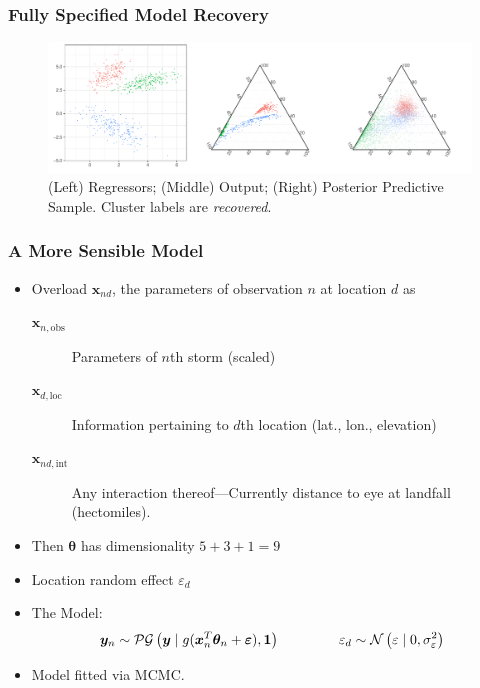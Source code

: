\documentclass[aspectratio=169,10pt,notes]{beamer}
\begin{document}
\begin{frame}
    \frametitle{Fully Specified Model Recovery}
    \begin{figure}[h]
    \centering
    \includegraphics[width=\textwidth]{./ch3/plots/simulated_reg}
    \caption{(Left) Regressors; (Middle) Output; (Right) Posterior Predictive Sample.
        Cluster labels are \emph{recovered}.
        }
    \end{figure}
\end{frame} %

\begin{frame}
    \frametitle{A More Sensible Model}
    \begin{itemize}
        \item Overload $\bm{x}_{nd}$, the parameters of observation $n$ at location $d$ as
        \begin{description}
            \item[$\bm{x}_{n,\text{obs}}$] Parameters of $n$th storm (scaled)
            \item[$\bm{x}_{d,\text{loc}}$] Information pertaining to $d$th location 
                (lat., lon., elevation)
            \item[$\bm{x}_{nd,\text{int}}$] Any interaction thereof---Currently 
                distance to eye at landfall (hectomiles).
        \end{description}
        \item Then $\bm{\theta}$ has dimensionality $5 + 3 + 1 = 9$
        \item Location random effect $\varepsilon_d$
        \item The Model:
        \[
            \bm{y}_n \sim \mathcal{PG}\left(\bm{y}\mid g(\bm{x}_n^T\bm{\theta}_n 
                + \bm{\varepsilon}), \bm{1}\right)
            \hspace{1.5cm}
            \varepsilon_d \sim \mathcal{N}\left(\varepsilon\mid 0, 
                \sigma_{\varepsilon}^2\right)
        \]
        \item Model fitted via MCMC.
    \end{itemize}
\end{frame} %
\end{document}
